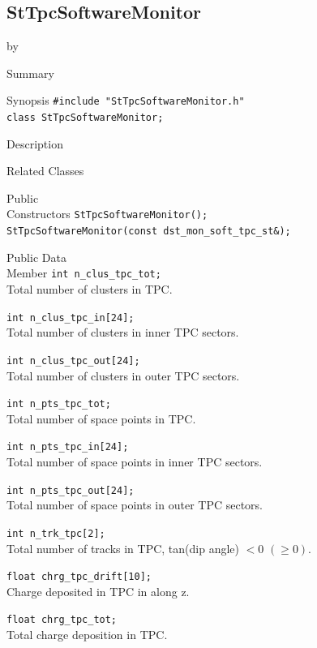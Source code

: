 \documentclass[twoside]{article}
\newcommand{\entrylabel}[1]{\mbox{\textbf{{#1}}}\hfil}%
\newenvironment{entry}
{\begin{list}{}%
    {\renewcommand{\makelabel}{\entrylabel}%
     \setlength{\labelwidth}{90pt}%
     \setlength{\leftmargin}{\labelwidth}
     \advance\leftmargin by \labelsep%
      }%
    }%
  {\end{list}}
\newcommand{\Entrylabel}[1]%
{\raisebox{0pt}[1ex][0pt]{\makebox[\labelwidth][l]%
    {\parbox[t]{\labelwidth}{\hspace{0pt}\textbf{{#1}}}}}}
\newenvironment{Entry}%
{\renewcommand{\entrylabel}{\Entrylabel}\begin{entry}}%
  {\end{entry}}
\begin{document}
\subsection{StTpcSoftwareMonitor}
\label{sec:StTpcSoftwareMonitor}
\begin{Entry}
\item[Summary]
\item[Synopsis]
    \verb+#include "StTpcSoftwareMonitor.h"+\\
    \verb+class StTpcSoftwareMonitor;+\\
\item[Description]
\item[Related Classes]
\item[Public\\ Constructors]
    \verb+StTpcSoftwareMonitor();+\\
    \verb+StTpcSoftwareMonitor(const dst_mon_soft_tpc_st&);+\\
\item[Public Data\\ Member]
    \verb+int n_clus_tpc_tot;+\\
    Total number of clusters in TPC.
    
    \verb+int n_clus_tpc_in[24];+\\
    Total number of clusters in inner TPC sectors.
    
    \verb+int n_clus_tpc_out[24];+\\
    Total number of clusters in outer TPC sectors.
    
    \verb+int n_pts_tpc_tot;+\\
    Total number of space points in TPC.
    
    \verb+int n_pts_tpc_in[24];+\\
    Total number of space points in inner TPC sectors.
    
    \verb+int n_pts_tpc_out[24];+\\
    Total number of space points in outer TPC sectors.
    
    \verb+int n_trk_tpc[2];+\\
    Total number of tracks in TPC, tan(dip angle) $< 0$ $(\ge 0)$.
    
    \verb+float chrg_tpc_drift[10];+\\
    Charge deposited in TPC in along z.
    
    \verb+float chrg_tpc_tot;+\\
    Total charge deposition in TPC.
    

\end{Entry}
\end{document}
